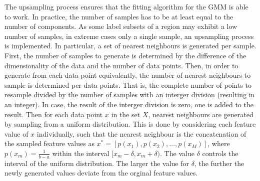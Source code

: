  The upsampling process ensures that the fitting algorithm for the GMM is able to work. In practice, the number of samples has to be at least equal to the number of components. As some label subsets of a region may exhibit a low number of samples, in extreme cases only a single sample, an upsampling process is implemented. In particular, a set of nearest neighbours is generated per sample. First, the number of samples to generate is determined by the difference of the dimensionality of the data and the number of data points. Then, in order to generate from each data point equivalently, the number of nearest neighbours to sample is determined per data points. That is, the complete number of points to resample divided by the number of samples with an interger division (resulting in an integer). In case, the result of the interger division is zero, one is added to the result. Then for each data point $x$ in the set $X$, nearest neighbours are generated by sampling from a uniform distribution. This is done by considering each feature value of $x$ individually, such that the nearest neighbour is the concatenation of the sampled feature values as $x^* = [p(x_1), p(x_2), \dots, p(x_M)]$, where $p(x_m)=\frac{1}{b-a}$ within the interval $[x_m-\delta, x_m+\delta)$. The value $\delta$ controls the interval of the uniform distribution. The larger the value for $\delta$, the further the newly generated values deviate from the orginal feature values.



